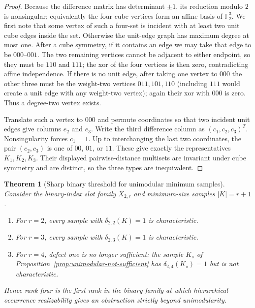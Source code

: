 \documentclass[11pt]{article}
\newtheorem{theorem}[definition]{Theorem}
\begin{document}
\begin{proof}
Because the difference matrix has determinant $\pm1$, its reduction modulo
$2$ is nonsingular; equivalently the four cube vertices form an affine basis
of $\mathbb F_2^3$.  We first note that some vertex of such a four-set is
incident with at least two unit cube edges inside the set.  Otherwise the
unit-edge graph has maximum degree at most one.  After a cube symmetry, if it
contains an edge we may take that edge to be $000$--$001$.  The two remaining
vertices cannot be adjacent to either endpoint, so they must be $110$ and
$111$; the xor of the four vertices is then zero, contradicting affine
independence.  If there is no unit edge, after taking one vertex to $000$ the
other three must be the weight-two vertices $011,101,110$ (including $111$
would create a unit edge with any weight-two vertex); again their xor with
$000$ is zero.  Thus a degree-two vertex exists.

Translate such a vertex to $000$ and permute coordinates so that two incident
unit edges give columns $e_2$ and $e_3$.  Write the third difference column as
$(c_1,c_2,c_3)^T$.  Nonsingularity forces $c_1=1$.  Up to interchanging the
last two coordinates, the pair $(c_2,c_3)$ is one of $00$, $01$, or $11$.
These give exactly the representatives $K_1,K_2,K_3$.  Their displayed
pairwise-distance multisets are invariant under cube symmetry and are distinct,
so the three types are inequivalent.
\end{proof}

\begin{theorem}[Sharp binary threshold for unimodular minimum samples]
\label{thm:binary-sharp-threshold}
Consider the binary-index slot family $X_{2,r}$ and minimum-size samples
$|K|=r+1$.
\begin{enumerate}[label=\textup{(\roman*)},leftmargin=*]
\item For $r=2$, every sample with $\delta_{2,2}(K)=1$ is characteristic.
\item For $r=3$, every sample with $\delta_{2,3}(K)=1$ is characteristic.
\item For $r=4$, defect one is no longer sufficient: the sample
$K_{\diamond}$ of Proposition~\ref{prop:unimodular-not-sufficient} has
$\delta_{2,4}(K_{\diamond})=1$ but is not characteristic.
\end{enumerate}
Hence rank four is the first rank in the binary family at which hierarchical
occurrence realizability gives an obstruction strictly beyond unimodularity.
\end{theorem}
\end{document}
